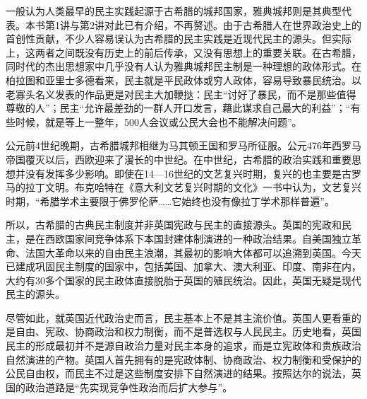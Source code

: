 一般认为人类最早的民主实践起源于古希腊的城邦国家，雅典城邦则是其典型代表。本书第1讲与第2讲对此已有介绍，不再赘述。由于古希腊人在世界政治史上的首创性贡献，不少人容易误认为古希腊的民主实践是近现代民主的源头。但实际上，这两者之间既没有历史上的前后传承，又没有思想上的重要关联。在古希腊，同时代的杰出思想家中几乎没有人认为雅典城邦民主制是一种理想的政体形式。在柏拉图和亚里士多德看来，民主就是平民政体或穷人政体，容易导致暴民统治。以老寡头名义发表的作品更是对民主大加鞭挞：民主“讨好了暴民，而不是那些值得尊敬的人”；民主“允许最差劲的一群人开口发言，藉此谋求自己最大的利益”；“有些时候，就是等上一整年，500人会议或公民大会也不能解决问题”。

公元前4世纪晚期，古希腊城邦相继为马其顿王国和罗马所征服。公元476年西罗马帝国覆灭以后，西欧迎来了漫长的中世纪。在中世纪，古希腊的政治实践和重要思想并没有发挥多少影响。即使在14—16世纪的文艺复兴时期，复兴的也主要是古罗马的拉丁文明。布克哈特在《意大利文艺复兴时期的文化》一书中认为，文艺复兴时期，“希腊学术主要限于佛罗伦萨……它始终也没有像拉丁学术那样普遍”。

所以，古希腊的古典民主制度并非英国宪政与民主的直接源头。英国的宪政和民主，是在西欧国家间竞争体系下本国封建体制演进的一种政治结果。自美国独立革命、法国大革命以来的自由民主浪潮，其最初的影响大体都可以追溯到英国。今天已建成巩固民主制度的国家中，包括美国、加拿大、澳大利亚、印度、南非在内，大约有30多个国家的民主政体直接脱胎于英国的殖民统治。因此，英国无疑是现代民主的源头。

尽管如此，就英国近代政治史而言，民主基本上不是其主流价值。英国人更看重的是自由、宪政、协商政治和权力制衡，而不是普选权与人民民主。历史地看，英国民主的形成最初并不是源自政治力量对民主本身的追求，而是立宪政体和贵族政治自然演进的产物。英国人首先拥有的是宪政体制、协商政治、权力制衡和受保护的公民自由权，而民主不过是这些制度安排下自然演进的结果。按照达尔的说法，英国的政治道路是“先实现竞争性政治而后扩大参与”。

